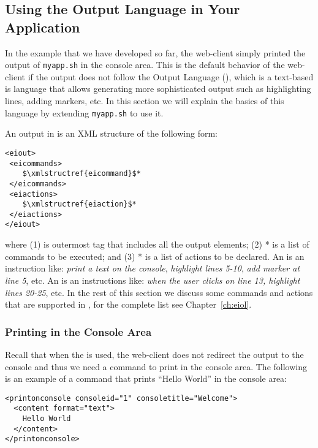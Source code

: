 \subsection{Using the \ei Output Language in Your Application}

In the example that we have developed so far, the web-client simply
printed the output of \texttt{myapp.sh} in the console area. This is
the default behavior of the web-client if the output does not follow
the \ei Output Language (\eiol), which is a text-based is language
that allows generating more sophisticated output such as highlighting
lines, adding markers, etc.
%
In this section we will explain the basics of this language by
extending \texttt{myapp.sh} to use it.

An output in \eiol is an XML structure of the following form:

\medskip
\noindent
\begin{lstlisting}
<eiout> 
 <eicommands>
    $\xmlstructref{eicommand}$*
 </eicommands>
 <eiactions>
    $\xmlstructref{eiaction}$*
 </eiactions>
</eiout>
\end{lstlisting}

\medskip
\noindent
where (1)  is outermost tag that includes all the output
elements; (2) * is a list of commands to be
executed; and (3) * is a list of actions to be
declared.
%
An  is an instruction like: \emph{print a text
  on the console}, \emph{highlight lines 5-10}, \emph{add marker at
  line 5}, etc.
%
An  is an instructions like: \emph{when the
  user clicks on line 13, highlight lines 20-25}, etc.
%
In the rest of this section we discuss some commands and actions that
are supported in \eiol, for the complete list see
Chapter~\ref{ch:eiol}.

\subsubsection{Printing in the Console Area}

Recall that when the \eiol is used, the web-client does not redirect
the output to the console and thus we need a command to
print in the console area.
%
The following is an example of a command that prints ``Hello World''
in the console area:

\medskip
\begin{lstlisting}
<printonconsole consoleid="1" consoletitle="Welcome">
  <content format="text">
    Hello World
  </content>
</printonconsole>
\end{lstlisting}


